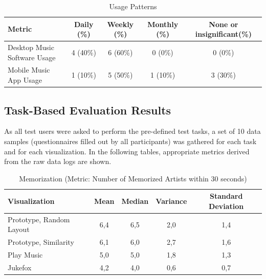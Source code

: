 \begin{table}[H]
\begin{center}
\begin{tabular}{ | l | c | c | c | c |}
	\hline
	\textbf{Metric} & \textbf{Daily (\%)} & \textbf{Weekly (\%)} & \textbf{Monthly (\%)} & \textbf{None or insignificant(\%)}\\ \hline
	Desktop Music Software Usage & 4 (40\%) & 6 (60\%) & 0 (0\%) & 0 (0\%) \\ \hline
	Mobile Music App Usage & 1 (10\%) & 5 (50\%) & 1 (10\%) & 3 (30\%) \\ \hline
\end{tabular}
\caption {Usage Patterns} \label{tab:usage-patterns} 
\end{center}
\end{table}

\subsection{Task-Based Evaluation Results}
\label{sec:taskbased-evaluation-results}

As all test users were asked to perform the pre-defined test tasks, a set of 10 data samples (questionnaires filled out by all participants) was gathered for each task and for each visualization. In the following tables, appropriate metrics derived from the raw data logs are shown.

\begin{table}[H]
\begin{center}
\begin{tabular}{ | l | c | c | c | c |}
	\hline
	\textbf{Visualization} & \textbf{Mean} & \textbf{Median} & \textbf{Variance} & \textbf{Standard Deviation}\\ \hline
	Prototype, Random Layout & 6,4 & 6,5 & 2,0 & 1,4 \\ \hline
	Prototype, Similarity & 6,1 & 6,0 & 2,7 & 1,6 \\ \hline
	Play Music & 5,0 & 5,0 & 1,8 & 1,3 \\ \hline
	Jukefox & 4,2 & 4,0 & 0,6 & 0,7 \\ \hline
\end{tabular}
\caption {Memorization (Metric: Number of Memorized Artists within 30 seconds)} \label{tab:memorization} 
\end{center}
\end{table}

